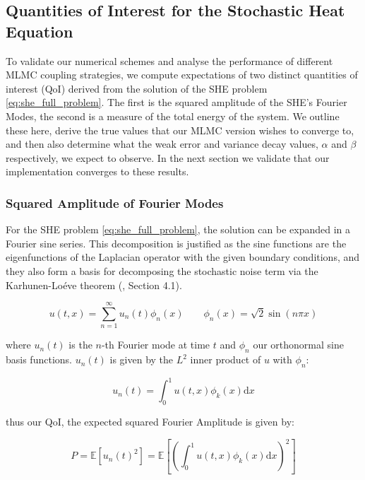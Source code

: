 \subsection{Quantities of Interest for the Stochastic Heat Equation}\label{sec:QoI_for_SHE}

To validate our numerical schemes and analyse the performance 
of different MLMC coupling strategies, we compute expectations
of two distinct quantities of interest (QoI) derived from the solution 
of the SHE problem \eqref{eq:she_full_problem}.
The first is the squared amplitude of the SHE's Fourier Modes,
the second is a measure of the total energy of the 
system. We outline these here, derive the true values that
our MLMC version wishes to converge to, and then also 
determine what the weak error and variance decay values, $\alpha$ and 
$\beta$ respectively, we expect to observe. In the next section
we validate that our implementation converges to these results. 

\subsubsection{Squared Amplitude of Fourier Modes}

For the SHE problem \eqref{eq:she_full_problem}, 
the solution can be expanded in a Fourier sine series. This 
decomposition is justified 
as the sine functions are the eigenfunctions of the Laplacian 
operator with the given boundary conditions, and they also form a basis 
for decomposing the stochastic noise term via the Karhunen-Loéve theorem
(\cite{da2014stochastic}, Section 4.1).

\begin{equation*}
    u(t,x) = \sum_{n=1}^\infty u_n(t)\phi_n(x) \qquad \phi_n(x) = \sqrt{2}\sin (n\pi x)
\end{equation*}

where $u_n(t)$ is the $n$-th Fourier mode at time $t$ and $\phi_n$ our 
orthonormal sine basis functions. $u_n(t)$ is given by the $L^2$ 
inner product of $u$ with $\phi_n$:

\begin{equation*}
    u_n(t) = \int_0^1 u(t,x)\phi_k(x)\mathrm{d}x
\end{equation*}

thus our QoI, the expected squared Fourier Amplitude is given by:

\begin{equation*}
    P = \mathbb{E}\left[u_n(t)^2\right] = 
    \mathbb{E}\left[\left(\int_0^1 u(t,x)\phi_k(x)\mathrm{d}x\right)^2\right]
\end{equation*}

